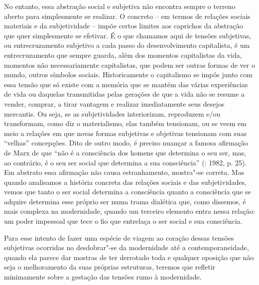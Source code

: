 No entanto, essa abstração social e subjetiva não encontra sempre o
terreno aberto para simplesmente se realizar. O concreto -- em termos de
relações sociais materiais e da subjetividade -- impõe certos limites
aos caprichos da abstração que quer simplesmente se efetivar. É o que
chamamos aqui de tensões subjetivas, ou entrecruzamento subjetivo a cada
passo do desenvolvimento capitalista, é um entrecruzamento que sempre
guarda, além dos momentos capitalistas da vida, momentos não
necessariamente capitalistas, que podem ser outras formas de ver o
mundo, outros símbolos sociais. Historicamente o capitalismo se impôs
junto com essa tensão que só existe com a memória que se mantém das
várias experiências de vida ou daquelas transmitidas pelas gerações de
que a vida não se resume a vender, comprar, a tirar vantagem e realizar
imediatamente seus desejos mercantis. Ou seja, se as subjetividades
interiorizam, reproduzem e/ou transformam, como diz o materialismo, elas
também tensionam, ou se veem em meio a relações em que novas formas
subjetivas e objetivas tensionam com suas ``velhas'' concepções. Dito de
outro modo, é preciso nuançar a famosa afirmação de Marx de que ``não é
a consciência dos homens que determina o seu ser, mas, ao contrário, é o
seu ser social que determina a sua consciência'' (: 1982, p. 25). Em
abstrato essa afirmação não causa estranhamento, mostra"-se correta. Mas
quando analisamos a história concreta das relações sociais e das
subjetividades, vemos que tanto o ser social determina a consciência
quanto a consciência que se adquire determina esse próprio ser numa
trama dialética que, como dissemos, é mais complexa na modernidade,
quando um terceiro elemento entra nessa relação: um poder impessoal que
tece o fio que entrelaça o ser social e sua consciência.

Para esse intento de fazer uma espécie de viagem ao coração dessas
tensões subjetivas ocorridas no desdobrar"-se da modernidade até a
contemporaneidade, quando ela parece dar mostras de ter derrotado toda e
qualquer oposição que não seja o melhoramento da suas próprias
estruturas, teremos que refletir minimamente sobre a gestação das
tensões rumo à modernidade.

